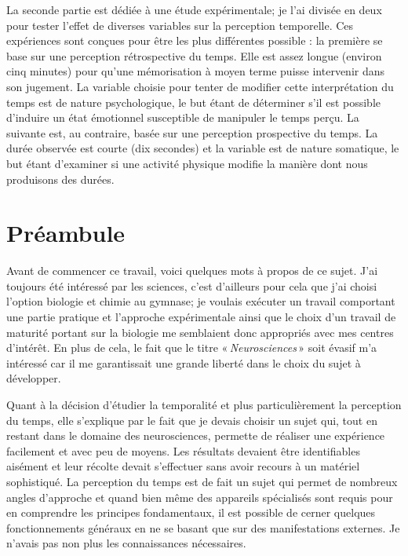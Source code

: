 \documentclass[12pt,fleqn,oneside,french,openany]{book} %
\begin{document}
La seconde partie est dédiée à une étude expérimentale; je l'ai divisée en deux pour tester l'effet de diverses variables sur la perception temporelle. Ces expériences sont conçues pour être les plus différentes possible : la première se base sur une perception rétrospective du temps. Elle est assez longue (environ cinq minutes) pour qu'une mémorisation à moyen terme puisse intervenir dans son jugement. La variable choisie pour tenter de modifier cette interprétation du temps est de nature psychologique, le but étant de déterminer s'il est possible d'induire un état émotionnel susceptible de manipuler le temps perçu. La suivante est, au contraire, basée sur une perception prospective du temps. La durée observée est courte (dix secondes) et la variable est de nature somatique, le but étant d'examiner si une activité physique modifie la manière dont nous produisons des durées.

\section{Préambule}
Avant de commencer ce travail, voici quelques mots à propos de ce sujet. J'ai toujours été intéressé par les sciences, c'est d'ailleurs pour cela que j'ai choisi l'option biologie et chimie au gymnase; je voulais exécuter un travail comportant une partie pratique et l'approche expérimentale ainsi que le choix d'un travail de maturité portant sur la biologie me semblaient donc appropriés avec mes centres d'intérêt. En plus de cela, le fait que le titre «\,\emph{Neurosciences}\,» soit évasif m'a intéressé car il me garantissait une grande liberté dans le choix du sujet à développer.

Quant à la décision d'étudier la temporalité et plus particulièrement la perception du temps, elle s'explique par le fait que je devais choisir un sujet qui, tout en restant dans le domaine des neurosciences, permette de réaliser une expérience facilement et avec peu de moyens. Les résultats devaient être identifiables aisément et leur récolte devait s'effectuer sans avoir recours à un matériel sophistiqué. La perception du temps est de fait un sujet qui permet de nombreux angles d'approche et quand bien même des appareils spécialisés sont requis pour en comprendre les principes fondamentaux, il est possible de cerner quelques fonctionnements généraux en ne se basant que sur des manifestations externes. Je n'avais pas non plus les connaissances nécessaires. 
\end{document}
